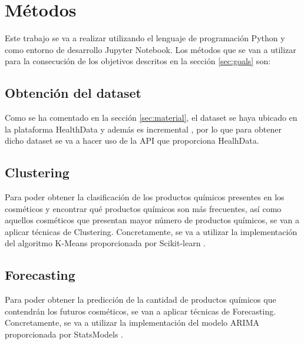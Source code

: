 \newpage
\section{Métodos}
\label{sec:methods}

Este trabajo se va a realizar utilizando el lenguaje de programación Python y como entorno de desarrollo Jupyter Notebook. Los métodos que se van a utilizar para la consecución de los objetivos descritos en la sección \ref{sec:goals} son:


\subsection{Obtención del dataset}

Como se ha comentado en la sección \ref{sec:material}, el dataset se haya ubicado en la plataforma HealthData y además es incremental \citep{dataset}, por lo que para obtener dicho dataset se va a hacer uso de la API \citep{healthdata-api} que proporciona HealhData. \\



\subsection{Clustering}

Para poder obtener la clasificación de los productos químicos presentes en los cosméticos y encontrar qué productos químicos son más frecuentes, así como aquellos cosméticos que presentan mayor número de productos químicos, se van a aplicar técnicas de Clustering. Concretamente, se va a utilizar la implementación del algoritmo K-Means proporcionada por Scikit-learn \citep{scikit-learn}.



\subsection{Forecasting}

Para poder obtener la predicción de la cantidad de productos químicos que contendrán los futuros cosméticos, se van a aplicar técnicas de Forecasting. Concretamente, se va a utilizar la implementación del modelo ARIMA proporcionada por StatsModels \citep{arima}.




